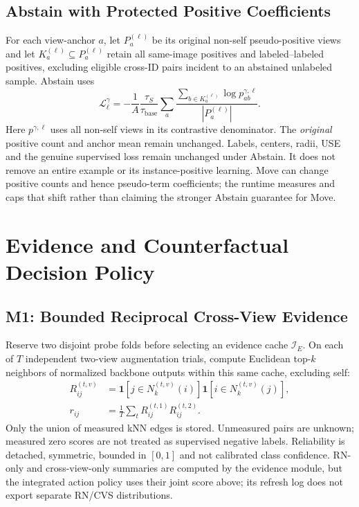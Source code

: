 \documentclass[conference]{IEEEtran}
\newcommand{\Lcal}{\mathcal L}
\newcommand{\ind}{\mathbf{1}}
\begin{document}
\subsection{Abstain with Protected Positive Coefficients}
For each view-anchor $a$, let $P_a^{(\ell)}$ be its original non-self pseudo-positive views and let $K_a^{(\ell)}\subseteq P_a^{(\ell)}$ retain all same-image positives and labeled--labeled positives, excluding eligible cross-ID pairs incident to an abstained unlabeled sample. Abstain uses
\begin{equation}\label{eq:abstain}
\Lcal_\ell^\gamma=-\frac1A\frac{\tau_S}{\tau_{\mathrm{base}}}
\sum_a\frac{\sum_{b\in K_a^{(\ell)}}\log p_{ab}^{\gamma,\ell}}
{|P_a^{(\ell)}|}.
\end{equation}
Here $p^{\gamma,\ell}$ uses all non-self views in its contrastive denominator. The \emph{original} positive count and anchor mean remain unchanged. Labels, centers, radii, USE and the genuine supervised loss remain unchanged under Abstain. It does not remove an entire example or its instance-positive learning. Move can change positive counts and hence pseudo-term coefficients; the runtime measures and caps that shift rather than claiming the stronger Abstain guarantee for Move.

\section{Evidence and Counterfactual Decision Policy}
\subsection{M1: Bounded Reciprocal Cross-View Evidence}
Reserve two disjoint probe folds before selecting an evidence cache $\mathcal I_E$. On each of $T$ independent two-view augmentation trials, compute Euclidean top-$k$ neighbors of normalized backbone outputs within this same cache, excluding self:
\begin{align}
R_{ij}^{(t,v)}&=\ind[j\in N_k^{(t,v)}(i)]\ind[i\in N_k^{(t,v)}(j)],\\
r_{ij}&=\frac1T\sum_tR_{ij}^{(t,1)}R_{ij}^{(t,2)}.
\end{align}
Only the union of measured kNN edges is stored. Unmeasured pairs are unknown; measured zero scores are not treated as supervised negative labels. Reliability is detached, symmetric, bounded in $[0,1]$ and not calibrated class confidence. RN-only and cross-view-only summaries are computed by the evidence module, but the integrated action policy uses their joint score above; its refresh log does not export separate RN/CVS distributions.
\end{document}

